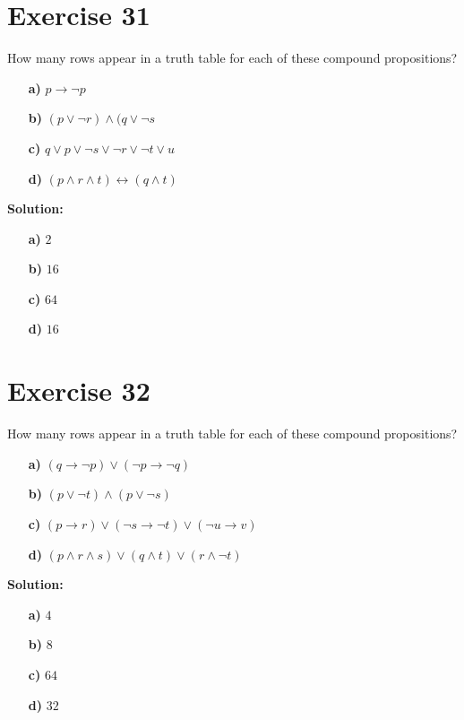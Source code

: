 \documentclass{Axon}
\begin{document}
\section*{Exercise 31}
How many rows appear in a truth table for each of these compound propositions?
\begin{enumerate}
    \item[\textbf{a)}] \(p \to \lnot p\)
    \item[\textbf{b)}] \((p \lor \lnot r) \land (q \lor \lnot s\)
    \item[\textbf{c)}] \(q \lor p \lor \lnot s \lor \lnot r \lor \lnot t \lor u\)
    \item[\textbf{d)}] \((p \land r \land t) \leftrightarrow (q \land t)\)
\end{enumerate}

\noindent
\textbf{Solution:}
\begin{enumerate}
    \item[\textbf{a)}] \(2\)
    \item[\textbf{b)}] \(16\)
    \item[\textbf{c)}] \(64\)
    \item[\textbf{d)}] \(16\)
\end{enumerate}

\section*{Exercise 32}
How many rows appear in a truth table for each of these compound propositions?
\begin{enumerate}
    \item[\textbf{a)}] \((q \to \lnot p) \lor (\lnot p \to \lnot q)\)
    \item[\textbf{b)}] \((p \lor \lnot t) \land (p \lor \lnot s)\)
    \item[\textbf{c)}] \((p \to r) \lor (\lnot s \to \lnot t) \lor (\lnot u \to v)\)
    \item[\textbf{d)}] \((p \land r \land s) \lor (q \land t) \lor (r \land \lnot t)\)
\end{enumerate}

\noindent
\textbf{Solution:}
\begin{enumerate}
    \item[\textbf{a)}] \(4\)
    \item[\textbf{b)}] \(8\)
    \item[\textbf{c)}] \(64\)
    \item[\textbf{d)}] \(32\)
\end{enumerate}
\end{document}
